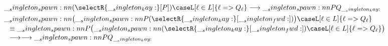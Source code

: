   
\begin{gather*}
  \begin{lgathered}
    \spawn{(\selectR{\kay}[P])}{\caseL[\ell \in L]{\ell => Q_{\ell}}}
      \longrightarrow \spawn{P}{Q_{\kay}}
    \\
    \begin{aligned}
      \MoveEqLeft[.5]
      \spawn{\bigl(\spawn{P}{(\selectR{\kay}[\fwd])}\bigr)}{\caseL[\ell \in L]{\ell => Q_{\ell}}} \\[-.75\jot]
        &\equiv \spawn{P}{\bigl(\spawn{(\selectR{\kay}[\fwd])}{\caseL[\ell \in L]{\ell => Q_{\ell}}}\bigr)} \\[-.75\jot]
        &\longrightarrow\longrightarrow \spawn{P}{Q_{\kay}}
    \end{aligned}
  \end{lgathered}
\end{gather*}



